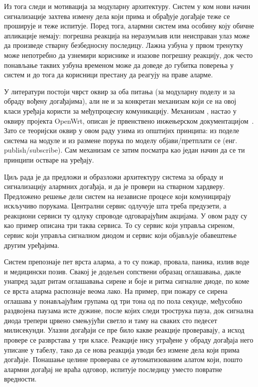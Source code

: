 \documentclass[12pt,oneside]{memoir}
\begin{document}
Из тога следи и мотивација за модуларну архитектуру. Систем у ком нови
начин сигнализације захтева измену дела који прима и обрађује догађаје
теже се проширује и теже испитује. Поред тога, алармни систем има
особину коју обичне апликације немају: погрешна реакција на неразумљив
или неисправан улаз може да произведе стварну безбедносну последицу.
Лажна узбуна у првом тренутку може непотребно да узнемири кориснике и
изазове погрешну реакцију, док често понављање таквих узбуна временом
може да доведе до губитка поверења у систем и до тога да корисници
престану да реагују на праве аларме.

У литератури постоји чврст оквир за оба питања (за модуларну поделу и за обраду вођену
догађајима), али не и за конкретан механизам који се на овој класи уређаја користи за
међупроцесну комуникацију. Механизам , настао у оквиру пројекта {\lat OpenWrt},
описан је првенствено инжењерском документацијом~\cite{OpenWrtUbus}. Зато се теоријски оквир
у овом раду узима из општијих принципа: из поделе система на модуле и из размене порука по
моделу објави/претплати се (енг. publish/subscribe). Сам механизам се затим посматра као један начин да се ти
принципи остваре на уређају.

Циљ рада је да предложи и образложи архитектуру система за обраду и сигнализацију алармних
догађаја, и да је провери на стварном хардверу. Предложено решење дели систем на независне
процесе који комуницирају искључиво порукама. Централни сервис одлучује шта треба предузети,
а реакциони сервиси ту одлуку спроводе одговарајућим акцијама. У овом раду су као пример
описана три таква сервиса. То су сервис који управља сиреном, сервис који управља сигналном
диодом и сервис који објављује обавештење другим уређајима.

Систем препознаје пет врста аларма, а то су пожар, провала, паника, излив воде и
медицински позив. 
Свакој је додељен сопствени образац оглашавања, дакле унапред задат ритам оглашавања сирене и боје и ритма сигналне диоде, по коме се врста аларма распознаје веома лако.
На пример, при пожару се сирена оглашава у понављајућим групама од три тона од по пола
секунде, међусобно раздвојена паузама исте дужине, после којих следи трострука пауза, док
сигнална диода трепери црвено смењујући светло и таму на сваких сто педесет милисекунди.
Улазни догађаји се пре било какве реакције проверавају, а исход провере се разврстава у три класе. Реакције
нису уграђене у обраду догађаја него уписане у табелу, тако да се нова реакција уводи без
измене дела који прима догађаје.
Понашање целине проверава се аутоматизованим алатом који, пошто алармни догађај не враћа
одговор, испитује последицу уместо повратне вредности.
\end{document}
